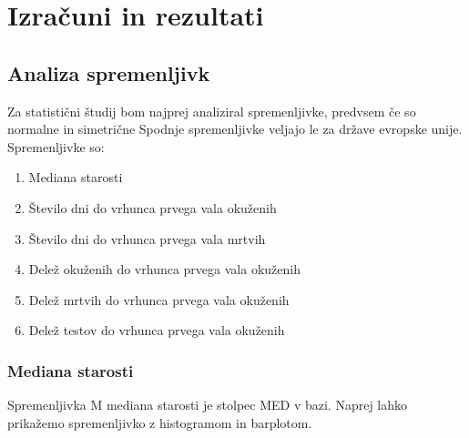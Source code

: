 \documentclass[a4paper,11pt]{article}
\begin{document}
\section{Izračuni in rezultati}

\subsection{Analiza spremenljivk}
Za statistični študij bom najprej analiziral spremenljivke, predvsem če so normalne in simetrične Spodnje spremenljivke veljajo le za države evropske unije. Spremenljivke so:
\begin{enumerate}
\item{Mediana starosti}
\item{Število dni do vrhunca prvega vala okuženih}
\item{Število dni do vrhunca prvega vala mrtvih}
\item{Delež okuženih do vrhunca prvega vala okuženih}
\item{Delež mrtvih do vrhunca prvega vala okuženih}
\item{Delež testov do vrhunca prvega vala okuženih}
\end{enumerate}

\subsubsection{Mediana starosti}
Spremenljivka M mediana starosti je stolpec MED v bazi. Naprej lahko prikažemo spremenljivko z histogramom in barplotom.
\end{document}
